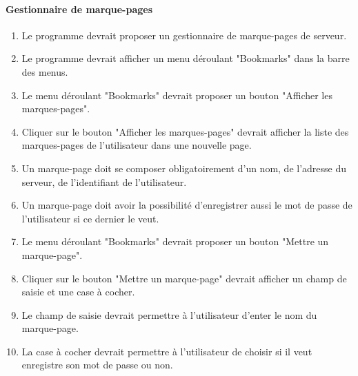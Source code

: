 \documentclass[10pt,a4paper]{report}
\begin{document}
\paragraph{Gestionnaire de marque-pages}
	\begin{enumerate}
		\item Le programme devrait proposer un gestionnaire de marque-pages de serveur.
		\item Le programme devrait afficher un menu déroulant "Bookmarks" dans la barre des menus.
		\item Le menu déroulant "Bookmarks" devrait proposer un bouton "Afficher les marques-pages".
		\item Cliquer sur le bouton "Afficher les marques-pages" devrait afficher la liste des marques-pages de l'utilisateur dans une nouvelle page.
		\item Un marque-page doit se composer obligatoirement d'un nom, de l'adresse du serveur, de l'identifiant de l'utilisateur.
		\item Un marque-page doit avoir la possibilité d'enregistrer aussi le mot de passe de l'utilisateur si ce dernier le veut.
		\item Le menu déroulant "Bookmarks" devrait proposer un bouton "Mettre un marque-page".
		\item Cliquer sur le bouton "Mettre un marque-page" devrait afficher un champ de saisie et une case à cocher.
		\item Le champ de saisie devrait permettre à l'utilisateur d'enter le nom du marque-page.
		\item La case à cocher devrait permettre à l'utilisateur de choisir si il veut enregistre son mot de passe ou non.
	\end{enumerate}
	
\end{document}
